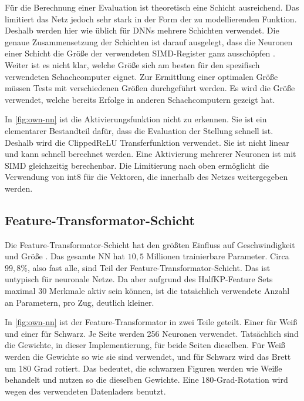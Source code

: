 Für die Berechnung einer Evaluation ist theoretisch eine Schicht ausreichend. Das limitiert das Netz jedoch sehr stark in der Form der zu modellierenden Funktion. Deshalb werden hier wie üblich für \acp{DNN} mehrere Schichten verwendet. Die genaue Zusammensetzung der Schichten ist darauf ausgelegt, dass die Neuronen einer Schicht die Größe der verwendeten \ac{SIMD}-Register ganz ausschöpfen \cite{YNasu2018}. Weiter ist es nicht klar, welche Größe sich am besten für den spezifisch verwendeten Schachcomputer eignet. Zur Ermittlung einer optimalen Größe müssen Tests mit verschiedenen Größen durchgeführt werden. Es wird die Größe verwendet, welche bereits Erfolge in anderen Schachcomputern gezeigt hat.

In \autoref{fig:own-nn} ist die Aktivierungsfunktion nicht zu erkennen. Sie ist ein elementarer Bestandteil dafür, dass die Evaluation der Stellung schnell ist. Deshalb wird die Clipped\ac{ReLU} Transferfunktion verwendet. Sie ist nicht linear und kann schnell berechnet werden. Eine Aktivierung mehrerer Neuronen ist mit \ac{SIMD} gleichzeitig berechenbar. Die Limitierung nach oben ermöglicht die Verwendung von int8 für die Vektoren, die innerhalb des Netzes weitergegeben werden.

\subsection{Feature-Transformator-Schicht}

Die Feature-Transformator-Schicht hat den größten Einfluss auf Geschwindigkeit und Größe \cite{StockfishNNUE}. Das gesamte \ac{NN} hat $10,5$ Millionen trainierbare Parameter. Circa $99,8\%$, also fast alle, sind Teil der Feature-Transformator-Schicht. Das ist untypisch für neuronale Netze. Da aber aufgrund des HalfKP-Feature Sets maximal 30 Merkmale aktiv sein können, ist die tatsächlich verwendete Anzahl an Parametern, pro Zug, deutlich kleiner.

In \autoref{fig:own-nn} ist der Feature-Transformator in zwei Teile geteilt. Einer für Weiß und einer für Schwarz. Je Seite werden 256 Neuronen verwendet. Tatsächlich sind die Gewichte, in dieser Implementierung, für beide Seiten dieselben. Für Weiß werden die Gewichte so wie sie sind verwendet, und für Schwarz wird das Brett um 180 Grad rotiert. Das bedeutet, die schwarzen Figuren werden wie Weiße behandelt und nutzen so die dieselben Gewichte. Eine 180-Grad-Rotation wird wegen des verwendeten Datenladers benutzt.

